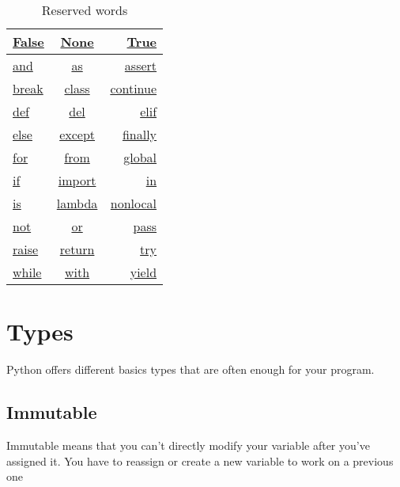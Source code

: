 \documentclass[a4paper, 12pt, titlepage]{scrartcl} %
\begin{document}
\begin{table}[h]
\begin{center}
{\renewcommand{\arraystretch}{2} %
{\setlength{\tabcolsep}{1.5cm} %
\begin{tabular}{|l|c|r|}
  \hline
  \hyperref[subsec:Bool]{False} & \hyperref[subsec:Keyword]{None} & \hyperref[subsec:Bool]{True} \\
  \hline
  \hyperref[subsec:Keyword]{and} & \hyperref[As]{as} & \hyperref[subsec:Assertion]{assert} \\
  \hline
  \hyperref[subsec:BCPR]{break} & \hyperref[sec:Class]{class} & \hyperref[subsec:BCPR]{continue} \\
  \hline
  \hyperref[sec:Function]{def} & \hyperref[Del]{del} & \hyperref[IEE]{elif} \\
  \hline
  \hyperref[subsec:Else]{else} & \hyperref[TEEF]{except} & \hyperref[TEEF]{finally} \\
  \hline
  \hyperref[subsec:For]{for} & \hyperref[subsec:Import]{from} & \hyperref[subsec:Global/Nonlocal]{global} \\
  \hline
  \hyperref[IEE]{if} & \hyperref[subsec:Import]{import} & \hyperref[Comprehension]{in} \\
  \hline
  \hyperref[subsec:Is]{is} & \hyperref[subsec:Lambda]{lambda} & \hyperref[subsec:Global/Nonlocal]{nonlocal} \\
  \hline 
  \hyperref[subsec:Keyword]{not} & \hyperref[subsec:Keyword]{or} & \hyperref[subsec:BCPR]{pass} \\
  \hline 
  \hyperref[Raise]{raise} & \hyperref[subsec:BCPR]{return} & \hyperref[TEEF]{try} \\
  \hline
  \hyperref[subsec:While]{while} & \hyperref[subsec:ContextManager]{with} & \hyperref[subsec:Generators]{yield} \\
  \hline
\end{tabular}}}
\end{center}
\caption{Reserved words}
\end{table} \vspace{5mm}



\clearpage
\section{Types}
Python offers different basics types that are often enough for your program.

\subsection{Immutable}
Immutable means that you can't directly modify your variable after you've assigned it. You have to reassign or create a new variable to work on a previous one
\end{document}
